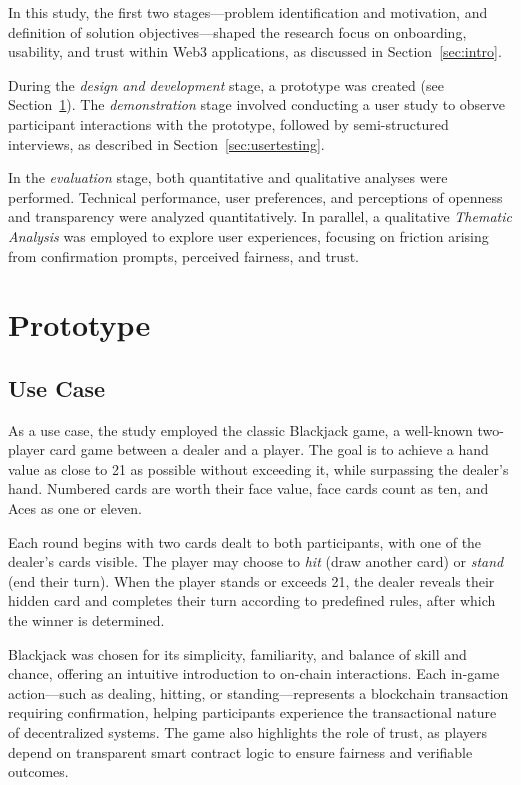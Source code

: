 \documentclass[10pt,conference]{IEEEtran}
\begin{document}
In this study, the first two stages—problem identification and motivation, and definition of solution objectives—shaped the research focus on onboarding, usability, and trust within Web3 applications, as discussed in Section~\ref{sec:intro}. 

During the \textit{design and development} stage, a prototype was created (see Section~\ref{sec:prototype}). The \textit{demonstration} stage involved conducting a user study to observe participant interactions with the prototype, followed by semi-structured interviews, as described in Section~\ref{sec:usertesting}. 

In the \textit{evaluation} stage, both quantitative and qualitative analyses were performed. Technical performance, user preferences, and perceptions of openness and transparency were analyzed quantitatively. In parallel, a qualitative \textit{Thematic Analysis} \cite{Braun2006,Miles2014} was employed to explore user experiences, focusing on friction arising from confirmation prompts, perceived fairness, and trust.



\section{Prototype} \label{sec:prototype}
\subsection{Use Case}
As a use case, the study employed the classic Blackjack game, a well-known two-player card game between a dealer and a player. The goal is to achieve a hand value as close to 21 as possible without exceeding it, while surpassing the dealer’s hand. Numbered cards are worth their face value, face cards count as ten, and Aces as one or eleven.

Each round begins with two cards dealt to both participants, with one of the dealer’s cards visible. The player may choose to \textit{hit} (draw another card) or \textit{stand} (end their turn). When the player stands or exceeds 21, the dealer reveals their hidden card and completes their turn according to predefined rules, after which the winner is determined.

Blackjack was chosen for its simplicity, familiarity, and balance of skill and chance, offering an intuitive introduction to on-chain interactions. Each in-game action—such as dealing, hitting, or standing—represents a blockchain transaction requiring confirmation, helping participants experience the transactional nature of decentralized systems. The game also highlights the role of trust, as players depend on transparent smart contract logic to ensure fairness and verifiable outcomes.
\end{document}
